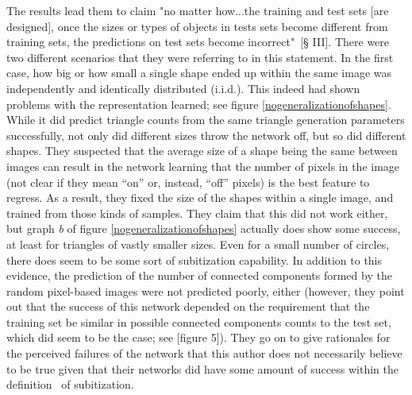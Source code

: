 The results lead them to claim "no matter how...the training and test sets [are designed], once the
sizes or types of objects in tests sets become different from training sets, the predictions on test
sets become incorrect"~\cite{guan2021understanding}[§ III]. There were two different scenarios that
they were referring to in this statement. In the first case, how big or how small a single shape
ended up within the same image was independently and identically distributed (i.i.d.). This indeed
had shown problems with the representation learned; see figure \ref{nogeneralizationofshapes}. While
it did predict triangle counts from the same triangle generation parameters successfully, not only
did different sizes throw the network off, but so did different shapes. They suspected that the
average size of a shape being the same between images can result in the network learning that the
number of pixels in the image (not clear if they mean ``on'' or, instead, ``off'' pixels) is the
best feature to regress. As a result, they fixed the size of the shapes within a single image,
and trained from those kinds of samples. They claim that this did not work either, but graph
\textit{b} of figure \ref{nogeneralizationofshapes} actually does show some success, at least for triangles
of vastly smaller sizes. Even for a small number of circles, there does seem to be some sort of
subitization capability. In addition to this evidence, the prediction of the number of connected
components formed by the random pixel-based images were not predicted poorly, either (however, they
point out that the success of this network depended on the requirement that the training set be
similar in possible connected components counts to the test set, which did seem to be the case; see
\cite{guan2021understanding}[figure 5]). They go on to give rationales for the perceived failures of
the network that this author does not necessarily believe to be true given that their networks did
have some amount of success within the definition~\cite{Zhang_2015_CVPR} of subitization.
